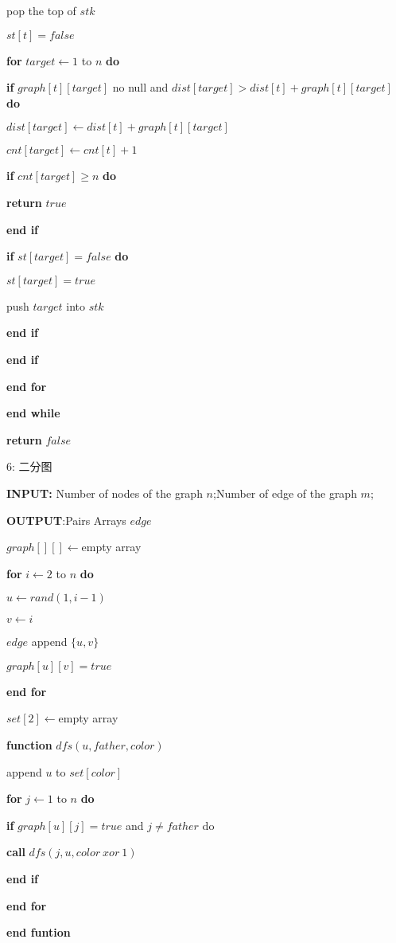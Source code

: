 \documentclass[
]{article}
\begin{document}
pop the top of \(stk\)

\(st[t]=false\)

\textbf{for} \(target \gets1\) to \(n\) \textbf{do}

\textbf{if} \(graph[t][target]\) no null and
\(dist[target]>dist[t]+graph[t][target]\) \textbf{do}

\(dist[target]\gets dist[t]+graph[t][target]\)

\(cnt[target]\gets cnt[t]+1\)

\textbf{if} \(cnt[target]\ge n\) \textbf{do}

\textbf{return} \(true\)

\textbf{end if}

\textbf{if} \(st[target]=false\) \textbf{do}

\(st[target]=true\)

push \(target\) into \(stk\)

\textbf{end if}

\textbf{end if}

\textbf{end for}

\textbf{end while}

\textbf{return} \(false\)

6: 二分图

\textbf{INPUT:} Number of nodes of the graph \(n\);Number of edge of the
graph \(m\);

\textbf{OUTPUT}:Pairs Arrays \(edge\)

\(graph[][]\gets \)empty array

\textbf{for} \(i\gets 2\) to \(n\) \textbf{do}

\(u\gets rand(1,i-1)\)

\(v\gets i\)

\(edge\) append \(\{u,v\}\)

\(graph[u][v]=true\)

\textbf{end for}

\(set[2]\gets\)empty array

\textbf{function} \(dfs (u,father,color) \)

append \(u\) to \(set[color]\)

\textbf{for} \(j\gets 1\) to \(n\) \textbf{do}

\textbf{if} \(graph[u][j]=true\) and \(j\neq father\) do

\textbf{call} \(dfs(j,u,color\ xor\ 1)\)

\textbf{end if}

\textbf{end for}

\textbf{end funtion}
\end{document}
